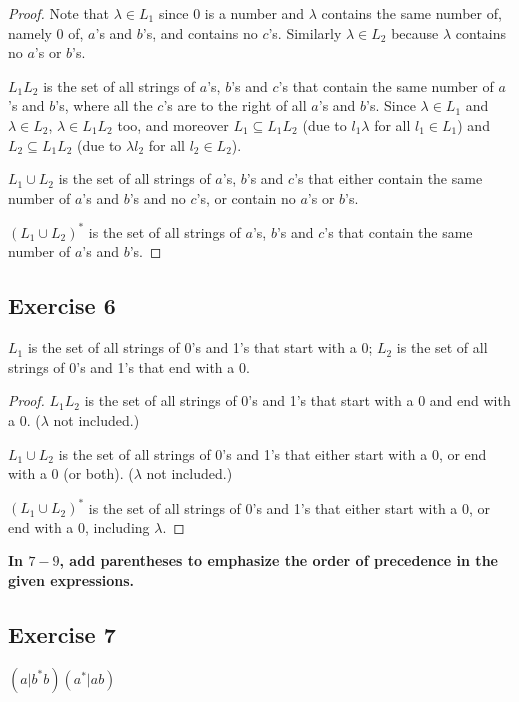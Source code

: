 \documentclass[14pt]{extarticle}
\newcommand{\cy}{\color{cyan}}
\begin{document}
\begin{proof}
    Note that \(\lambda \in L_1\) since 0 is a number and \(\lambda\) contains the same number of, namely 0 of, \(a\)'s
    and \(b\)'s, and contains no \(c\)'s. Similarly \(\lambda \in L_2\) because \(\lambda\) contains no \(a\)'s or \(b\)'s.

    \(L_1L_2\) is the set of all strings of \(a\)’s, \(b\)’s and \(c\)’s that contain the same number of \(a\)’s and \(b\)’s,
    where all the \(c\)'s are to the right of all \(a\)’s and \(b\)’s. Since \(\lambda \in L_1\) and \(\lambda \in L_2\),
    \(\lambda \in L_1L_2\) too, and moreover \(L_1 \subseteq L_1L_2\) (due to \(l_1 \lambda\) for all \(l_1 \in L_1\)) and
    \(L_2 \subseteq L_1L_2\) (due to \(\lambda l_2\) for all \(l_2 \in L_2\)).

    \(L_1 \cup L_2\) is the set of all strings of \(a\)’s, \(b\)’s and \(c\)’s that either contain the same number of \(a\)’s and
    \(b\)’s and no \(c\)'s, or contain no \(a\)'s or \(b\)'s.

    \((L_1 \cup L_2)^*\) is the set of all strings of \(a\)’s, \(b\)’s and \(c\)’s that contain the same number of \(a\)’s and
    \(b\)’s.
\end{proof}

\subsection{Exercise 6}
\(L_1\) is the set of all strings of 0’s and 1’s that start with a 0; \(L_2\) is the set of all strings of 0’s and 1’s
that end with a 0.

\begin{proof}
    \(L_1L_2\) is the set of all strings of 0’s and 1’s that start with a 0 and end with a 0. (\(\lambda\) not included.)

    \(L_1 \cup L_2\) is the set of all strings of 0’s and 1’s that either start with a 0, or end with a 0 (or both).
    (\(\lambda\) not included.)

    \((L_1 \cup L_2)^*\) is the set of all strings of 0’s and 1’s that either start with a 0, or end with a 0, including
    \(\lambda\).
\end{proof}

{\bf \cy In \(7-9\), add parentheses to emphasize the order of precedence in the given expressions.}

\subsection{Exercise 7}
\((a | b^*b)(a^* | ab)\)
\end{document}
